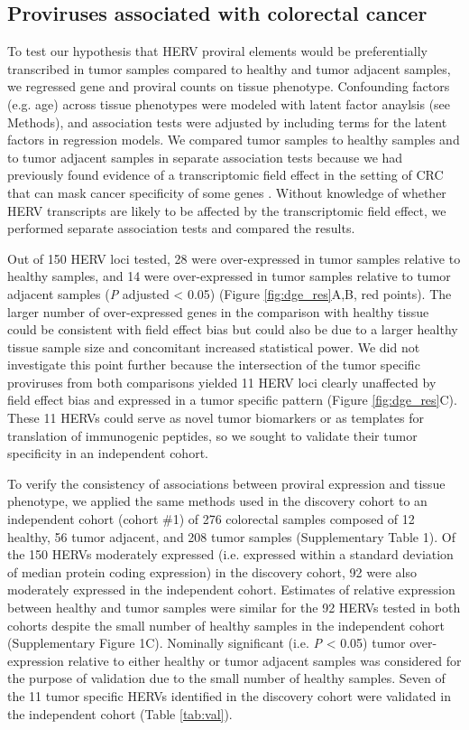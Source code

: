 \subsection*{Proviruses associated with colorectal cancer}
To test our hypothesis that HERV proviral elements would be preferentially transcribed in tumor samples compared to healthy and tumor adjacent samples, we regressed gene and proviral counts on tissue phenotype.
Confounding factors (e.g. age) across tissue phenotypes were modeled with latent factor anaylsis (see Methods), and association tests were adjusted by including terms for the latent factors in regression models.
We compared tumor samples to healthy samples and to tumor adjacent samples in separate association tests because we had previously found evidence of a transcriptomic field effect in the setting of CRC that can mask cancer specificity of some genes \citep{Dampier2020}.
Without knowledge of whether HERV transcripts are likely to be affected by the transcriptomic field effect, we performed separate association tests and compared the results.

Out of 150 HERV loci tested, 28 were over-expressed in tumor samples relative to healthy samples, and 14 were over-expressed in tumor samples relative to tumor adjacent samples (\emph{P} adjusted < 0.05) (Figure \ref{fig:dge_res}A,B, red points).
The larger number of over-expressed genes in the comparison with healthy tissue could be consistent with field effect bias but could also be due to a larger healthy tissue sample size and concomitant increased statistical power.
We did not investigate this point further because the intersection of the tumor specific proviruses from both comparisons yielded 11 HERV loci clearly unaffected by field effect bias and expressed in a tumor specific pattern (Figure \ref{fig:dge_res}C).
These 11 HERVs could serve as novel tumor biomarkers or as templates for translation of immunogenic peptides, so we sought to validate their tumor specificity in an independent cohort.

To verify the consistency of associations between proviral expression and tissue phenotype, we applied the same methods used in the discovery cohort to an independent cohort (cohort \#1) of 276 colorectal samples composed of 12 healthy, 56 tumor adjacent, and 208 tumor samples (Supplementary Table 1).
Of the 150 HERVs moderately expressed (i.e. expressed within a standard deviation of median protein coding expression) in the discovery cohort, 92 were also moderately expressed in the independent cohort.
Estimates of relative expression between healthy and tumor samples were similar for the 92 HERVs tested in both cohorts despite the small number of healthy samples in the independent cohort (Supplementary Figure 1C).
Nominally significant (i.e. \emph{P} < 0.05) tumor over-expression relative to either healthy or tumor adjacent samples was considered for the purpose of validation due to the small number of healthy samples.
Seven of the 11 tumor specific HERVs identified in the discovery cohort were validated in the independent cohort (Table \ref{tab:val}).

